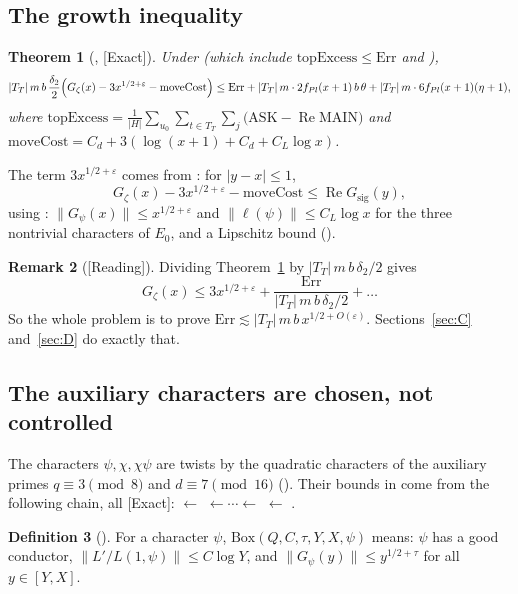 \documentclass[11pt]{article}
\newcommand{\Exact}{\textcolor{exactc}{\textsf{\small[Exact]}}}
\newcommand{\Reading}{\textcolor{readc}{\textsf{\small[Reading]}}}
\newcommand{\eps}{\varepsilon}
\newcommand{\re}{\operatorname{Re}}
\newcommand{\ASK}{\mathrm{ASK}}
\newcommand{\MAIN}{\mathrm{MAIN}}
\newcommand{\Err}{\mathrm{Err}}
\newcommand{\Gz}{G_\zeta}
\newcommand{\Gsig}{G_{\mathrm{sig}}}
\theoremstyle{plain}
\newtheorem{theorem}{Theorem}[section]
\theoremstyle{definition}
\newtheorem{definition}[theorem]{Definition}
\newtheorem{remark}[theorem]{Remark}
\begin{document}
\subsection{The growth inequality}

\begin{theorem}[, \Exact]\label{thm:growth}
Under  (which include $\mathrm{topExcess}\le \Err$ and
),
\[
|T_T|\, m\, b\,\frac{\delta_2}{2}\Bigl(\Gz(x) - 3x^{1/2+\eps} - \mathrm{moveCost}\Bigr)
\le \Err + |T_T|\, m\cdot 2f_{Pl}(x+1)\,b\,\theta + |T_T|\, m\cdot 6f_{Pl}(x+1)(\eta+1),
\]
where $\mathrm{topExcess} = \frac{1}{|H|}\sum_{u_0}\sum_{t\in T_T}\sum_{j}\bigl(\ASK - \re\MAIN\bigr)$
and $\mathrm{moveCost} = C_d + 3(\log(x+1)+C_d+C_L\log x)$.
\end{theorem}

The term $3x^{1/2+\eps}$ comes from : for $|y-x|\le 1$,
\[
\Gz(x) - 3x^{1/2+\eps} - \mathrm{moveCost} \le \re\Gsig(y),
\]
using : $\|G_\psi(x)\|\le x^{1/2+\eps}$ and $\|\ell(\psi)\|\le C_L\log x$ for the
three nontrivial characters of $E_0$, and a Lipschitz bound ().

\begin{remark}[\Reading]
Dividing Theorem~\ref{thm:growth} by $|T_T|\,m\,b\,\delta_2/2$ gives
\[
\Gz(x)\le 3x^{1/2+\eps} + \frac{\Err}{|T_T|\,m\,b\,\delta_2/2}+\dots
\]
So the whole problem is to prove $\Err\lesssim |T_T|\,m\,b\,x^{1/2+O(\eps)}$. Sections~\ref{sec:C} and~\ref{sec:D} do exactly that.
\end{remark}

\subsection{The auxiliary characters are chosen, not controlled}

The characters $\psi,\chi,\chi\psi$ are twists by the quadratic characters of the auxiliary primes
$q\equiv 3\pmod 8$ and $d\equiv 7\pmod{16}$ (). Their bounds in 
come from the following chain, all \Exact:
 $\leftarrow$  $\leftarrow\cdots\leftarrow$
 $\leftarrow$ .

\begin{definition}[]
For a character $\psi$, $\mathrm{Box}(Q,C,\tau,Y,X,\psi)$ means: $\psi$ has a good conductor,
$\|L'/L(1,\psi)\|\le C\log Y$, and $\|G_\psi(y)\|\le y^{1/2+\tau}$ for all $y\in[Y,X]$.
\end{definition}
\end{document}
